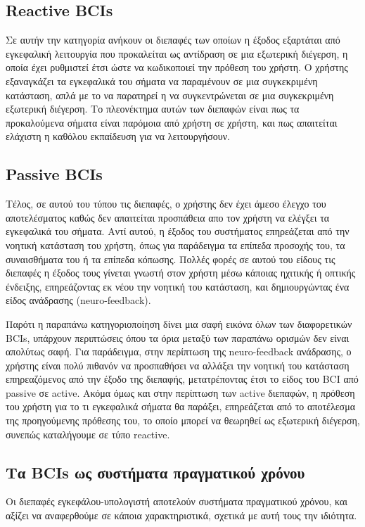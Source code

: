 \documentclass[11pt,a4paper,english,greek,twoside]{../Thesis}
\begin{document}
  \subsection{Reactive BCIs}
  \par Σε αυτήν την κατηγορία ανήκουν οι διεπαφές των οποίων η έξοδος εξαρτάται από εγκεφαλική λειτουργία που προκαλείται ως αντίδραση σε μια εξωτερική διέγερση, η οποία έχει ρυθμιστεί έτσι ώστε να κωδικοποιεί την πρόθεση του χρήστη. Ο χρήστης εξαναγκάζει τα εγκεφαλικά του σήματα να παραμένουν σε μια συγκεκριμένη κατάσταση, απλά με το να παρατηρεί η να συγκεντρώνεται σε μια συγκεκριμένη εξωτερική διέγερση. Το πλεονέκτημα αυτών των διεπαφών είναι πως τα προκαλούμενα σήματα είναι παρόμοια από χρήστη σε χρήστη, και πως απαιτείται ελάχιστη η καθόλου εκπαίδευση για να λειτουργήσουν.

  \subsection{Passive BCIs}
  \par Τέλος, σε αυτού του τύπου τις διεπαφές, ο χρήστης δεν έχει άμεσο έλεγχο του αποτελέσματος καθώς δεν απαιτείται προσπάθεια απο τον χρήστη να ελέγξει τα εγκεφαλικά του σήματα. Αντί αυτού, η έξοδος του συστήματος επηρεάζεται από την νοητική κατάσταση του χρήστη, όπως για παράδειγμα τα επίπεδα προσοχής του, τα συναισθήματα του ή τα επίπεδα κόπωσης. Πολλές φορές σε αυτού του είδους τις διεπαφές η έξοδος τους γίνεται γνωστή στον χρήστη μέσω κάποιας ηχιτικής ή οπτικής ένδειξης, επηρεάζοντας εκ νέου την νοητική του κατάσταση, και δημιουργώντας ένα είδος ανάδρασης (neuro-feedback). 
  
  \par Παρότι η παραπάνω κατηγοριοποίηση δίνει μια σαφή εικόνα όλων των διαφορετικών BCIs, υπάρχουν περιπτώσεις όπου τα όρια μεταξύ των παραπάνω ορισμών δεν είναι απολύτως σαφή. Για παράδειγμα, στην περίπτωση της neuro-feedback ανάδρασης, ο χρήστης είναι πολύ πιθανόν να προσπαθήσει να αλλάξει την νοητική του κατάσταση επηρεαζόμενος από την έξοδο της διεπαφής, μετατρέποντας έτσι το είδος του BCI από passive σε active. Ακόμα όμως και στην περίπτωση των active διεπαφών, η πρόθεση του χρήστη για το τι εγκεφαλικά σήματα θα παράξει, επηρεάζεται από το αποτέλεσμα της προηγούμενης πρόθεσης του, το οποίο μπορεί να θεωρηθεί ως εξωτερική διέγερση, συνεπώς καταλήγουμε σε τύπο reactive. 

\subsection{Τα BCIs ως συστήματα πραγματικού χρόνου}
\label{subsec:bci_as_rt}
\par Οι διεπαφές εγκεφάλου-υπολογιστή αποτελούν συστήματα πραγματικού χρόνου, και αξίζει να αναφερθούμε σε κάποια χαρακτηριστικά, σχετικά με αυτή τους την ιδιότητα.
\end{document}
